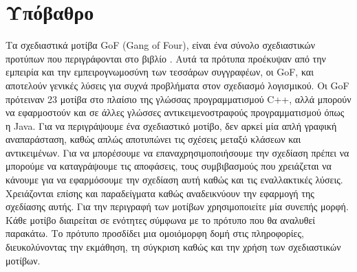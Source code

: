 \section{Υπόβαθρο}
\label{sec:background}
Τα σχεδιαστικά μοτίβα GoF (Gang of Four), είναι ένα σύνολο σχεδιαστικών προτύπων που περιγράφονται στο βιβλίο \cite{GoF}.
Αυτά τα πρότυπα προέκυψαν από την εμπειρία και την εμπειρογνωμοσύνη των τεσσάρων συγγραφέων, οι GoF, και αποτελούν γενικές λύσεις 
για συχνά προβλήματα στον σχεδιασμό λογισμικού. Οι GoF πρότειναν 23 μοτίβα στο πλαίσιο της γλώσσας προγραμματισμού C++, αλλά μπορούν 
να εφαρμοστούν και σε άλλες γλώσσες αντικειμενοστραφούς προγραμματισμού όπως η Java. Για να περιγράψουμε ένα σχεδιαστικό μοτίβο, δεν αρκεί μία
απλή γραφική αναπαράσταση, καθώς απλώς αποτυπώνει τις σχέσεις μεταξύ κλάσεων και αντικειμένων. Για να μπορέσουμε να επαναχρησιμοποιήσουμε την σχεδίαση
πρέπει να μπορούμε να καταγράψουμε τις αποφάσεις, τους συμβιβασμούς που χρειάζεται να κάνουμε για να εφαρμόσουμε την σχεδίαση αυτή 
καθώς και τις εναλλακτικές λύσεις. Χρειάζονται επίσης και παραδείγματα καθώς αναδεικνύουν την εφαρμογή της σχεδίασης αυτής. 
Για την περιγραφή των μοτίβων χρησιμοποιείτε μία συνεπής μορφή. Κάθε μοτίβο διαιρείται σε ενότητες σύμφωνα με το πρότυπο που θα αναλυθεί παρακάτω. 
Το πρότυπο προσδίδει μια ομοιόμορφη δομή στις πληροφορίες, διευκολύνοντας την εκμάθηση, τη σύγκριση καθώς και την χρήση των σχεδιαστικών μοτίβων.

